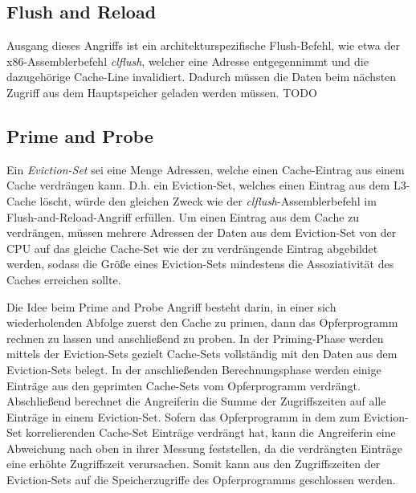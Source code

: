 \subsection{Flush and Reload}

Ausgang dieses Angriffs ist ein architekturspezifische Flush-Befehl, wie etwa der x86-Assemblerbefehl \textit{clflush}, welcher eine Adresse entgegennimmt und die dazugehörige Cache-Line invalidiert. Dadurch müssen die Daten beim nächsten Zugriff aus dem Hauptspeicher geladen werden müssen. \cite{FlushReload}
TODO 

\subsection{Prime and Probe}

Ein \textit{Eviction-Set} sei eine Menge Adressen, welche einen Cache-Eintrag aus einem Cache verdrängen kann. D.h. ein Eviction-Set, welches einen Eintrag aus dem L3-Cache löscht, würde den gleichen Zweck wie der \textit {clflush}-Assemblerbefehl im Flush-and-Reload-Angriff erfüllen. 
Um einen Eintrag aus dem Cache zu verdrängen, müssen mehrere Adressen der Daten aus dem Eviction-Set von der CPU auf das gleiche Cache-Set wie der zu verdrängende Eintrag abgebildet werden, sodass die Größe eines Eviction-Sets mindestens die Assoziativität des Caches erreichen sollte.

Die Idee beim Prime and Probe Angriff besteht darin, in einer sich wiederholenden Abfolge zuerst den Cache zu primen, dann das Opferprogramm rechnen zu lassen und anschließend zu proben.
In der Priming-Phase werden mittels der Eviction-Sets gezielt Cache-Sets vollständig mit den Daten aus dem Eviction-Sets belegt.
In der anschließenden Berechnungsphase werden einige Einträge aus den geprimten Cache-Sets vom Opferprogramm verdrängt. Abschließend berechnet die Angreiferin die Summe der Zugriffszeiten auf alle Einträge in einem Eviction-Set.
Sofern das Opferprogramm in dem zum Eviction-Set korrelierenden Cache-Set Einträge verdrängt hat, kann die Angreiferin eine Abweichung nach oben in ihrer Messung feststellen, da die verdrängten Einträge eine erhöhte Zugriffszeit verursachen. Somit kann aus den Zugriffszeiten der Eviction-Sets auf die Speicherzugriffe des Opferprogramms geschlossen werden.

